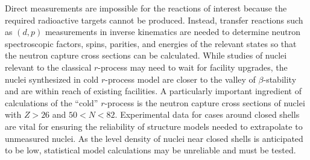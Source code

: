{%
Direct measurements are impossible for the reactions of interest %
 because  the required radioactive targets cannot be produced. Instead, transfer reactions such as $(d,p)$ measurements in inverse kinematics are needed to determine neutron spectroscopic factors, spins, parities, and energies of the relevant states so that the neutron capture cross sections can be calculated.
While studies of nuclei relevant to the classical $r$-process may need to wait for facility upgrades, the nuclei synthesized in cold %
$r$-process model %
are closer to the valley of $\beta$-stability %
and are %
within reach %
of existing facilities.
A particularly important ingredient of calculations of the ``cold'' $r$-process %
is
the neutron capture cross sections of nuclei with $Z>26$ and $50<N<82$. Experimental data for cases around closed shells are vital for ensuring the reliability of structure models needed to extrapolate to unmeasured nuclei. As the level density of nuclei near closed shells is anticipated to be low, statistical model calculations may be unreliable and must be tested. %

\rhead{\desctext{\statename}}

}
